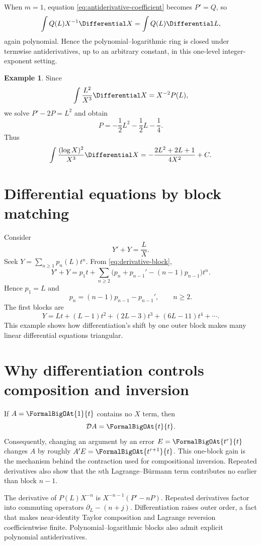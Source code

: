 \documentclass[11pt,oneside]{book}
\theoremstyle{definition}
\newtheorem{example}[theorem]{Example}
\theoremstyle{remark}
\newcommand{\D}{\mathcal D}
\begin{document}
When $m=1$, equation \eqref{eq:antiderivative-coefficient} becomes $P'=Q$,
so
\[
 \int Q(L)X^{-1}\Differential X=\int Q(L)\Differential L,
\]
again polynomial.  Hence the polynomial--logarithmic ring is closed under
termwise antiderivatives, up to an arbitrary constant, in this one-level
integer-exponent setting.

\begin{example}
Since
\[
 \int \frac{L^2}{X^3}\Differential X=X^{-2}P(L),
\]
we solve $P'-2P=L^2$ and obtain
\[
 P=-\frac12L^2-\frac12L-\frac14.
\]
Thus
\[
 \int \frac{(\log X)^2}{X^3}\Differential X
 =-\frac{2L^2+2L+1}{4X^2}+C.
\]
\end{example}

\section{Differential equations by block matching}
Consider
\begin{equation}\label{eq:simple-ode}
 Y'+Y=\frac{L}{X}.
\end{equation}
Seek $Y=\sum_{n\ge1}p_n(L)t^n$.  From
\eqref{eq:derivative-block},
\[
 Y'+Y=p_1t+\sum_{n\ge2}
 \bigl(p_n+p_{n-1}'-(n-1)p_{n-1}\bigr)t^n.
\]
Hence $p_1=L$ and
\[
 p_n=(n-1)p_{n-1}-p_{n-1}',\qquad n\ge2.
\]
The first blocks are
\[
 Y=Lt+(L-1)t^2+(2L-3)t^3+(6L-11)t^4+\cdots.
\]
This example shows how differentiation's shift by one outer block makes many
linear differential equations triangular.

\section{Why differentiation controls composition and inversion}
If $A=\FormalBigOAt{1}{t}$ contains no $X$ term, then
\begin{equation}\label{eq:A-derivative-small}
 \D A=\FormalBigOAt{t}{t}.
\end{equation}
Consequently, changing an argument by an error $E=\FormalBigOAt{t^r}{t}$ changes
$A$ by roughly $A'E=\FormalBigOAt{t^{r+1}}{t}$.  This one-block gain is the mechanism
behind the contraction used for compositional inversion.  Repeated derivatives
also show that the $n$th Lagrange--B\"urmann term contributes no earlier than
block $n-1$.

\begin{summarybox}
The derivative of $P(L)X^{-n}$ is
$X^{-n-1}(P'-nP)$.  Repeated derivatives factor into commuting operators
$\partial_L-(n+j)$.  Differentiation raises outer order, a fact that makes
near-identity Taylor composition and Lagrange reversion coefficientwise
finite.  Polynomial--logarithmic blocks also admit explicit polynomial
antiderivatives.
\end{summarybox}
\end{document}
